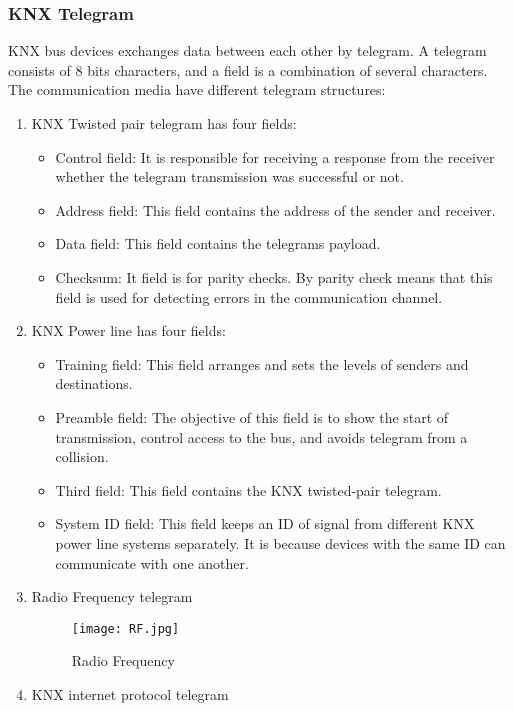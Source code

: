 \documentclass{article}
\begin{document}
\subsubsection{KNX Telegram}
KNX bus devices exchanges data between each other by telegram. A telegram consists of 8 bits characters, and a field is a combination of several characters. The communication media have different telegram structures\cite{KNXBasic}:
\begin{enumerate}
    \item KNX Twisted pair telegram has four fields: 
    \begin{itemize}
        \item Control field: It is responsible for receiving a response from the receiver whether the telegram transmission was successful or not. 
        \item Address field: This field contains the address of the sender and receiver.
        \item Data field: This field contains the telegrams payload.
        \item Checksum: It field is for parity checks. By parity check means that this field is used for detecting errors in the communication channel. \cite{KNXBasic}
    \end{itemize}
    \item KNX Power line has four fields: 
    \begin{itemize}
        \item Training field: This field arranges and sets the levels of senders and destinations. 
        \item Preamble field: The objective of this field is to show the start of transmission, control access to the bus, and avoids telegram from a collision.
        \item Third field: This field contains the KNX twisted-pair telegram. 
        \item System ID field: This field keeps an ID of signal from different KNX power line systems separately. It is because devices with the same ID can communicate with one another.\cite{KNXBasic}
    \end{itemize}
    \item Radio Frequency telegram 
    \begin{figure}[h!]
        \centering
        \texttt{[image: RF.jpg]}
        \caption{Radio Frequency \cite{KNXBasic}}
        \label{fig:my_label}
    \end{figure}
    \item KNX internet protocol telegram

\end{enumerate}
\end{document}
